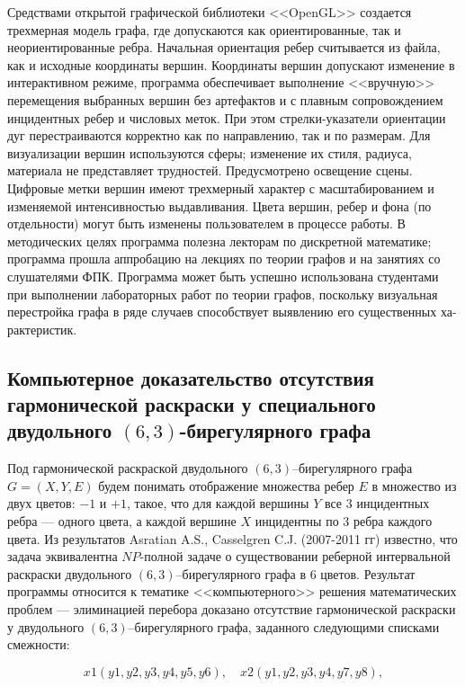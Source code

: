 Средствами открытой графической библиотеки <<OpenGL>> создается трехмерная модель графа, где допускаются как ориентированные, так и неориентированные ребра. Начальная ориентация ребер считывается из файла, как и исходные координаты вершин.
Координаты вершин допускают изменение в интерактивном режиме, программа обеспечивает выполнение <<вручную>> перемещения выбранных вершин без артефактов и с плавным сопровождением инцидентных ребер и числовых меток. При этом стрелки-указатели ориентации дуг перестраиваются корректно как по направлению, так и по размерам.
Для визуализации вершин используются сферы; изменение их стиля, радиуса, материала не представляет трудностей. Предусмотрено освещение сцены.
Цифровые метки вершин имеют трехмерный характер с масштабированием и изменяемой интенсивностью выдавливания. Цвета вершин, ребер и фона (по отдельности) могут быть изменены пользователем в процессе работы.
В методических целях программа полезна лекторам по дискретной математике; программа прошла аппробацию на лекциях по теории графов и на занятиях со слушателями ФПК. Программа может быть успешно использована студентами при выполнении лабораторных работ по теории графов, поскольку визуальная перестройка графа в ряде случаев способствует выявлению его существенных ха-рактеристик.




\subsection{Компьютерное доказательство отсутствия гармонической раскраски у специального двудольного $(6,3)$-бирегулярного графа}

Под гармонической раскраской двудольного $(6,3)$--бирегулярного графа $G=(X,Y,E)$ будем понимать отображение множества ребер $E$ в множество из двух цветов: $-1$ и $+1$, такое, что для каждой вершины $Y$ все $3$ инцидентных ребра --- одного цвета, а каждой вершине $X$ инцидентны по $3$ ребра каждого цвета.
Из результатов Asratian A.S., Casselgren C.J. (2007-2011 гг) известно, что задача эквивалентна $NP$-полной задаче о существовании реберной интервальной раскраски двудольного $(6,3)$--бирегулярного графа в 6 цветов.
Результат программы относится к тематике <<компьютерного>> решения математических проблем --- элиминацией перебора доказано отсутствие гармонической раскраски у двудольного $(6,3)$--бирегулярного графа, заданного следующими списками смежности:

 $$x1(y1,y2,y3,y4,y5,y6), \quad x2(y1,y2,y3,y4,y7,y8),$$


